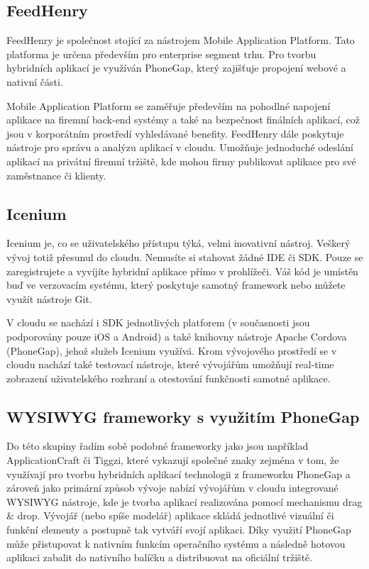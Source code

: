 \subsection{FeedHenry}
FeedHenry je společnost stojící za nástrojem Mobile Application Platform. Tato platforma je určena především pro enterprise segment trhu. Pro tvorbu hybridních aplikací je využíván PhoneGap, který zajišťuje propojení webové a nativní části.

Mobile Application Platform se zaměřuje především na pohodlné napojení aplikace na firemní back-end systémy a také na bezpečnost finálních aplikací, což jsou v korporátním prostředí vyhledávané benefity. FeedHenry dále poskytuje nástroje pro správu a analýzu aplikací v cloudu. Umožňuje jednoduché odeslání aplikací na privátní firemní tržiště, kde mohou firmy publikovat aplikace pro své zaměstnance či klienty.

\subsection{Icenium}
Icenium je, co se uživatelského přístupu týká, velmi inovativní nástroj. Veškerý vývoj totiž přesunul do cloudu. Nemusíte si stahovat žádné IDE či SDK. Pouze se zaregistrujete a vyvíjíte hybridní aplikace přímo v prohlížeči. Váš kód je umístěn buď ve verzovacím systému, který poskytuje samotný framework nebo můžete využít nástroje Git.

V cloudu se nachází i SDK jednotlivých platforem (v současnosti jsou podporovány pouze iOS a Android) a také knihovny nástroje Apache Cordova (PhoneGap), jehož služeb Icenium využívá. Krom vývojového prostředí se v cloudu nachází také testovací nástroje, které vývojářům umožňují real-time zobrazení uživatelského rozhraní a otestování funkčnosti samotné aplikace.

\subsection{WYSIWYG frameworky s využitím PhoneGap}
Do této skupiny řadím sobě podobné frameworky jako jsou například ApplicationCraft či Tiggzi, které vykazují společné znaky zejména v tom, že využívají pro tvorbu hybridních aplikací technologii z frameworku PhoneGap a zároveň jako primární způsob vývoje nabízí vývojářům v cloudu integrované WYSIWYG nástroje, kde je tvorba aplikací realizována pomocí mechanismu drag \& drop. Vývojář (nebo spíše modelář) aplikace skládá jednotlivé vizuální či funkční elementy a postupně tak vytváří svojí aplikaci. Díky využití PhoneGap může přistupovat k nativním funkcím operačního systému a následně hotovou aplikaci zabalit do nativního balíčku a distribuovat na oficiální tržiště.

